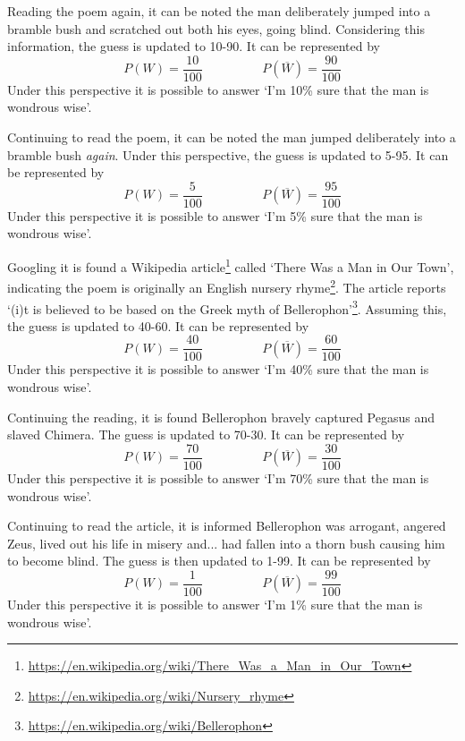 \documentclass[a4paper]{exam}
\theoremstyle{plain}
\begin{document}
Reading the poem again, it can be noted the man deliberately jumped into a bramble bush and scratched out both his eyes, going blind. Considering this information, the guess is updated to 10-90. It can be represented by \[ P(W) = \frac{10}{100} \hspace{2cm} P(\overline{W}) = \frac{90}{100} \] Under this perspective it is possible to answer `I'm 10\% sure that the man is wondrous wise'.

Continuing to read the poem, it can be noted the man jumped deliberately into a bramble bush \textit{again}. Under this perspective, the guess is updated to 5-95. It can be represented by \[ P(W) = \frac{5}{100} \hspace{2cm} P(\overline{W}) = \frac{95}{100} \] Under this perspective it is possible to answer `I'm 5\% sure that the man is wondrous wise'.

Googling it is found a Wikipedia article\footnote{\url{https://en.wikipedia.org/wiki/There_Was_a_Man_in_Our_Town}} called `There Was a Man in Our Town', indicating the poem is originally an English nursery rhyme\footnote{\url{https://en.wikipedia.org/wiki/Nursery_rhyme}}. The article reports `(i)t is believed to be based on the Greek myth of Bellerophon'\footnote{\url{https://en.wikipedia.org/wiki/Bellerophon}}. Assuming this, the guess is updated to 40-60. It can be represented by \[ P(W) = \frac{40}{100} \hspace{2cm} P(\overline{W}) = \frac{60}{100} \] Under this perspective it is possible to answer `I'm 40\% sure that the man is wondrous wise'. 

Continuing the reading, it is found Bellerophon bravely captured Pegasus and slaved Chimera. The guess is updated to 70-30. It can be represented by \[ P(W) = \frac{70}{100} \hspace{2cm} P(\overline{W}) = \frac{30}{100} \] Under this perspective it is possible to answer `I'm 70\% sure that the man is wondrous wise'. 

Continuing to read the article, it is informed Bellerophon was arrogant, angered Zeus, lived out his life in misery and... had fallen into a thorn bush causing him to become blind. The guess is then updated to 1-99. It can be represented by \[ P(W) = \frac{1}{100} \hspace{2cm} P(\overline{W}) = \frac{99}{100} \] Under this perspective it is possible to answer `I'm 1\% sure that the man is wondrous wise'. 

\end{document}
